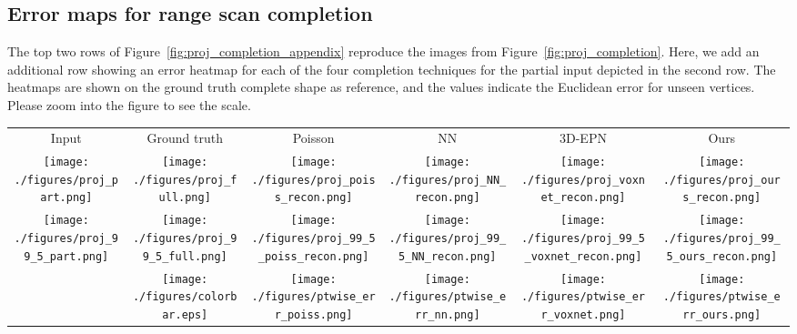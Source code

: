 \subsection{Error maps for range scan completion}
The top two rows of Figure~\ref{fig:proj_completion_appendix} reproduce the images from Figure~\ref{fig:proj_completion}. Here, we add an additional row showing an error heatmap for each of the four completion techniques for the partial input depicted in the second row. The heatmaps are shown on the ground truth complete shape as reference, and the values indicate the Euclidean error for unseen vertices. Please zoom into the figure to see the scale. 
\begin{figure*}[ht]
\centering
\addtolength{\tabcolsep}{-4pt}
\begin{tabular}{cccccc}
Input & Ground truth & Poisson & NN & 3D-EPN & Ours \\[4pt]
\texttt{[image: ./figures/proj\_part.png]} & 
\texttt{[image: ./figures/proj\_full.png]} & 
\texttt{[image: ./figures/proj\_poiss\_recon.png]} &  
\texttt{[image: ./figures/proj\_NN\_recon.png]} &  
\texttt{[image: ./figures/proj\_voxnet\_recon.png]} &  
\texttt{[image: ./figures/proj\_ours\_recon.png]} \\[4pt]
\texttt{[image: ./figures/proj\_99\_5\_part.png]} &
\texttt{[image: ./figures/proj\_99\_5\_full.png]} &
\texttt{[image: ./figures/proj\_99\_5\_poiss\_recon.png]} &
\texttt{[image: ./figures/proj\_99\_5\_NN\_recon.png]} &
\texttt{[image: ./figures/proj\_99\_5\_voxnet\_recon.png]} &
\texttt{[image: ./figures/proj\_99\_5\_ours\_recon.png]} \\[4pt]
& \texttt{[image: ./figures/colorbar.eps]} & \texttt{[image: ./figures/ptwise\_err\_poiss.png]} & \texttt{[image: ./figures/ptwise\_err\_nn.png]} &
\texttt{[image: ./figures/ptwise\_err\_voxnet.png]} & 
\texttt{[image: ./figures/ptwise\_err\_ours.png]} 
\end{tabular}
\vspace{2mm}
\caption{Comparison of different synthetic range scan completion methods. From left to right: input range scan, ground truth complete shape, Poisson reconstruction~\cite{kazhdan2013screened}, NN completion, 3D-EPN~\cite{dai2016shape}, and our method. 
} 
\label{fig:proj_completion_appendix}
\end{figure*}


